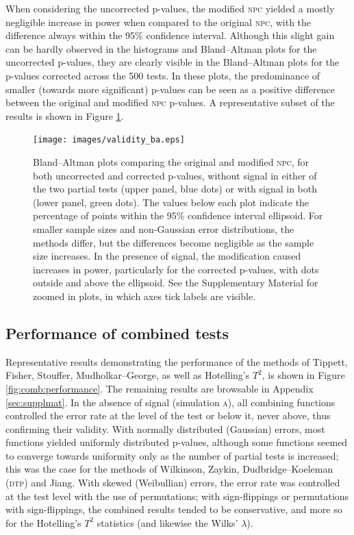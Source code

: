 When considering the uncorrected p-values, the modified \textsc{npc} yielded a mostly negligible increase in power when compared to the original \textsc{npc}, with the difference always within the 95\% confidence interval. Although this slight gain can be hardly observed in the histograms and Bland--Altman plots for the uncorrected p-values, they are clearly visible in the Bland--Altman plots for the p-values corrected across the 500 tests. In these plots, the predominance of smaller (towards more significant) p-values can be seen as a positive difference between the original and modified \textsc{npc} p-values. A representative subset of the results is shown in Figure \ref{fig:comb:validity_ba}.

\begin{figure}[p]
\begin{center}
\centerline{\texttt{[image: images/validity\_ba.eps]}}
\end{center}
\vspace{-3mm}
\caption[Bland--Altman plots comparing original and modified \textsc{npc}.]{Bland--Altman plots comparing the original and modified \textsc{npc}, for both uncorrected and corrected p-values, without signal in either of the two partial tests (upper panel, blue dots) or with signal in both (lower panel, green dots). The values below each plot indicate the percentage of points within the 95\% confidence interval ellipsoid. For smaller sample sizes and non-Gaussian error distributions, the methods differ, but the differences become negligible as the sample size increases. In the presence of signal, the modification caused increases in power, particularly for the corrected p-values, with dots outside and above the ellipsoid. See the Supplementary Material for zoomed in plots, in which axes tick labels are visible.}
\label{fig:comb:validity_ba}
\end{figure}

\subsection{Performance of combined tests}

Representative results demonstrating the performance of the methods of Tippett, Fisher, Stouffer, Mudholkar--George, as well as Hotelling's $T^2$, is shown in Figure \ref{fig:comb:performance}. The remaining results are browsable in Appendix \ref{sec:supplmat}. In the absence of signal (simulation \textsc{a}), all combining functions controlled the error rate at the level of the test or below it, never above, thus confirming their validity. With normally distributed (Gaussian) errors, most functions yielded uniformly distributed p-values, although some functions seemed to converge towards uniformity only as the number of partial tests is increased; this was the case for the methods of Wilkinson, Zaykin, Dudbridge--Koeleman (\textsc{dtp}) and Jiang. With skewed (Weibullian) errors, the error rate was controlled at the test level with the use of permutations; with sign-flippings or permutations with sign-flippings, the combined results tended to be conservative, and more so for the Hotelling's $T^2$ statistics (and likewise the Wilks' $\lambda$).

